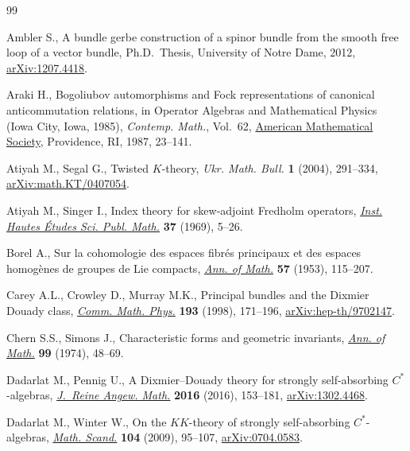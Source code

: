 \documentclass[pdftex]{sigma}
\numberwithin{equation}{section}
\begin{document}
\begin{thebibliography}{99}
\footnotesize\itemsep=0pt

Ambler S., A bundle gerbe construction of a spinor bundle from the smooth free
 loop of a vector bundle, Ph.D.~Thesis, {U}niversity of {N}otre {D}ame, 2012,
 \href{https://arxiv.org/abs/1207.4418}{arXiv:1207.4418}.

Araki H., Bogoliubov automorphisms and {F}ock representations of canonical
 anticommutation relations, in Operator {A}lgebras and {M}athematical
 {P}hysics ({I}owa {C}ity, {I}owa, 1985), \textit{Contemp. Math.}, Vol.~62,
  \href{https://doi.org/10.1090/conm/062/878376}{American Mathematical Society}, Providence, RI, 1987, 23--141.

Atiyah M., Segal G., Twisted {$K$}-theory, \textit{Ukr. Math. Bull.} \textbf{1}
 (2004), 291--334, \href{https://arxiv.org/abs/math.KT/0407054}{arXiv:math.KT/0407054}.

Atiyah M., Singer I., Index theory for skew-adjoint {F}redholm operators,
  \href{https://doi.org/10.1007/BF02684885}{\textit{Inst. Hautes \'Etudes Sci. Publ. Math.}} \textbf{37} (1969), 5--26.

Borel A., Sur la cohomologie des espaces fibr\'es principaux et des espaces
 homog\`enes de groupes de {L}ie compacts, \href{https://doi.org/10.2307/1969728}{\textit{Ann. of Math.}} \textbf{57}
 (1953), 115--207.

Carey A.L., Crowley D., Murray M.K., Principal bundles and the {D}ixmier
 {D}ouady class, \href{https://doi.org/10.1007/s002200050323}{\textit{Comm. Math. Phys.}} \textbf{193} (1998), 171--196,
 \href{https://arxiv.org/abs/hep-th/9702147}{arXiv:hep-th/9702147}.

Chern S.S., Simons J., Characteristic forms and geometric invariants,
 \href{https://doi.org/10.2307/1971013}{\textit{Ann. of Math.}} \textbf{99} (1974), 48--69.

Dadarlat M., Pennig U., A {D}ixmier--{D}ouady theory for strongly
 self-absorbing {$C^*$}-algebras,  \href{https://doi.org/10.1515/crelle-2014-0044}{\textit{J.~Reine Angew. Math.}} \textbf{2016}
 (2016), 153--181, \href{https://arxiv.org/abs/1302.4468}{arXiv:1302.4468}.

Dadarlat M., Winter W., On the {$KK$}-theory of strongly self-absorbing
 {$C^*$}-algebras,  \href{https://doi.org/10.7146/math.scand.a-15086}{\textit{Math. Scand.}} \textbf{104} (2009), 95--107,
 \href{https://arxiv.org/abs/0704.0583}{arXiv:0704.0583}.


\end{thebibliography}
\end{document}
